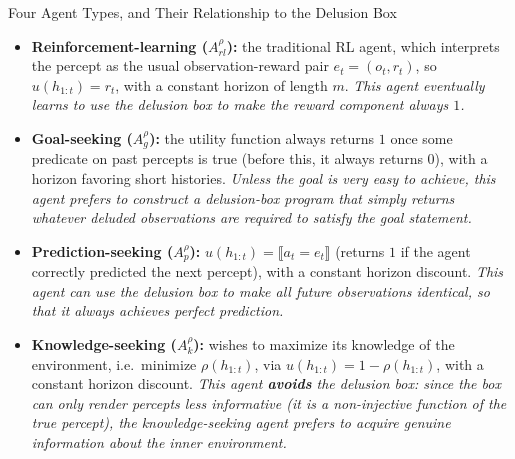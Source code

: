 \documentclass[aspectratio=169,10pt]{beamer}
\begin{document}
\begin{frame}{Four Agent Types, and Their Relationship to the Delusion Box}
  \begin{itemize}
    \item \textbf{Reinforcement-learning ($A^\rho_{rl}$):} the traditional
      RL agent, which interprets the percept as the usual
      observation-reward pair $e_t=(o_t,r_t)$, so $u(h_{1:t})=r_t$, with a
      constant horizon of length $m$. \emph{This agent eventually learns
      to use the delusion box to make the reward component always $1$.}
    \item \textbf{Goal-seeking ($A^\rho_g$):} the utility function always
      returns $1$ once some predicate on past percepts is true (before
      this, it always returns $0$), with a horizon favoring short
      histories. \emph{Unless the goal is very easy to achieve, this agent
      prefers to construct a delusion-box program that simply returns
      whatever deluded observations are required to satisfy the goal
      statement.}
    \item \textbf{Prediction-seeking ($A^\rho_p$):} $u(h_{1:t}) =
      \llbracket a_t=e_t\rrbracket$ (returns $1$ if the agent correctly
      predicted the next percept), with a constant horizon discount.
      \emph{This agent can use the delusion box to make all future
      observations identical, so that it always achieves perfect
      prediction.}
    \item \textbf{Knowledge-seeking ($A^\rho_k$):} wishes to maximize its
      knowledge of the environment, i.e.\ minimize $\rho(h_{1:t})$, via
      $u(h_{1:t})=1-\rho(h_{1:t})$, with a constant horizon discount.
      \emph{This agent \textbf{avoids} the delusion box: since the box can
      only render percepts \emph{less} informative (it is a non-injective
      function of the true percept), the knowledge-seeking agent prefers
      to acquire genuine information about the inner environment.}
  \end{itemize}
\end{frame}
\end{document}
